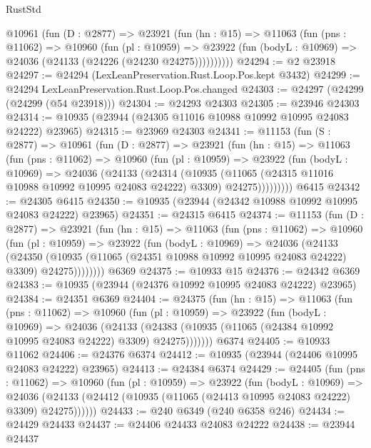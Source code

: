 \begin{lexlean}{RustStd}
\begin{coremodule}
{{{{{{{{{{{{{{{{{{{      @10961
        (fun (D : @2877) =>
        @23921
          (fun (hn : @15) =>
          @11063
            (fun (pns : @11062) =>
            @10960
              (fun (pl : @10959) =>
              @23922 (fun (bodyL : @10969) => @24036 (@24133 (@24226 (@24230 @24275))))))))))
@24294 := @2 @23918
@24297 := @24294 (LexLeanPreservation.Rust.Loop.Pos.kept @3432)
@24299 := @24294 LexLeanPreservation.Rust.Loop.Pos.changed
@24303 := @24297 (@24299 (@24299 (@54 @23918)))
@24304 := @24293 @24303
@24305 := @23946 @24303
@24314 := @10935 (@23944 (@24305 @11016 @10988 @10992 @10995 @24083 @24222) @23965)
@24315 := @23969 @24303
@24341 := @11153
    (fun (S : @2877) =>
    @10961
      (fun (D : @2877) =>
      @23921
        (fun (hn : @15) =>
        @11063
          (fun (pns : @11062) =>
          @10960
            (fun (pl : @10959) =>
            @23922
              (fun (bodyL : @10969) =>
              @24036
                (@24133
                  (@24314
                    (@10935
                      (@11065 (@24315 @11016 @10988 @10992 @10995 @24083 @24222) @3309)
                      @24275)))))))))
    @6415
@24342 := @24305 @6415
@24350 := @10935 (@23944 (@24342 @10988 @10992 @10995 @24083 @24222) @23965)
@24351 := @24315 @6415
@24374 := @11153
    (fun (D : @2877) =>
    @23921
      (fun (hn : @15) =>
      @11063
        (fun (pns : @11062) =>
        @10960
          (fun (pl : @10959) =>
          @23922
            (fun (bodyL : @10969) =>
            @24036
              (@24133
                (@24350
                  (@10935 (@11065 (@24351 @10988 @10992 @10995 @24083 @24222) @3309) @24275))))))))
    @6369
@24375 := @10933 @15
@24376 := @24342 @6369
@24383 := @10935 (@23944 (@24376 @10992 @10995 @24083 @24222) @23965)
@24384 := @24351 @6369
@24404 := @24375
    (fun (hn : @15) =>
    @11063
      (fun (pns : @11062) =>
      @10960
        (fun (pl : @10959) =>
        @23922
          (fun (bodyL : @10969) =>
          @24036
            (@24133
              (@24383 (@10935 (@11065 (@24384 @10992 @10995 @24083 @24222) @3309) @24275)))))))
    @6374
@24405 := @10933 @11062
@24406 := @24376 @6374
@24412 := @10935 (@23944 (@24406 @10995 @24083 @24222) @23965)
@24413 := @24384 @6374
@24429 := @24405
    (fun (pns : @11062) =>
    @10960
      (fun (pl : @10959) =>
      @23922
        (fun (bodyL : @10969) =>
        @24036 (@24133 (@24412 (@10935 (@11065 (@24413 @10995 @24083 @24222) @3309) @24275))))))
@24433 := @240 @6349 (@240 @6358 @246)
@24434 := @24429 @24433
@24437 := @24406 @24433 @24083 @24222
@24438 := @23944 @24437
}}}}}}}}}}}}}}}}}}}
\end{coremodule}
\end{lexlean}
